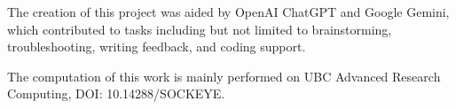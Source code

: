 \documentclass[conference]{IEEEtran}
\begin{document}
The creation of this project was aided by OpenAI ChatGPT and Google Gemini, which contributed to tasks including but not limited to brainstorming, troubleshooting, writing feedback, and coding support.

The computation of this work is mainly performed on UBC Advanced Research Computing, DOI: 10.14288/SOCKEYE.

\printbibliography
\end{document}

